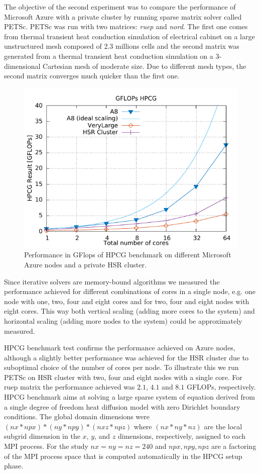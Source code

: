 \documentclass[3p,times]{elsarticle}
\begin{document}
The objective of the second experiment was to compare the performance of Microsoft Azure with a private cluster by running sparse matrix solver called PETSc. PETSc was run with two matrices: \textit{ruep} and \textit{nord}. The first one comes from thermal transient heat conduction simulation of electrical cabinet on a large unstructured mesh composed of 2.3 millions cells and the second matrix was generated from a thermal transient heat conduction simulation on a 3-dimensional Cartesian mesh of moderate size. Due to different mesh types, the second matrix converges much quicker than the first one. 

\begin{figure}
	\centering
	\includegraphics[width=.5\linewidth]{gplt-gflops-hpcg}
	
	\caption{Performance in GFlops of HPCG benchmark on different Microsoft Azure nodes and a private HSR cluster. }
	\label{fig:hpcg}
\end{figure}

Since iterative solvers are memory-bound algorithms we measured the performance achieved for different combinations of cores in a single node, e.g. one node with one, two, four and eight cores and for two, four and eight nodes with eight cores. This way both vertical scaling (adding more cores to the system) and horizontal scaling (adding more nodes to the system) could be approximately measured. %

HPCG benchmark test confirms the performance achieved on Azure nodes, although a slightly better performance was achieved for the HSR cluster due to suboptimal choice of the number of cores per node.  To illustrate this we run PETSc on HSR cluster with two, four and eight nodes with a single core. For ruep matrix the performance achieved was $2.1$, $4.1$ and $8.1$ GFLOPs, respectively. HPCG benchmark aims at solving a large sparse system of equation derived from a single degree of freedom heat diffusion model with zero Dirichlet boundary conditions. The global domain dimensions were $(nx * npx ) * (ny * npy ) * (nxz * npz )$ where $(nx * ny * nz )$ are the local subgrid dimension in the $x$, $y$, and $z$ dimensions, respectively, assigned to each MPI process. For the study $nx = ny = nz = 240$ and $npx, npy, npz$ are a factoring of the MPI process space that is computed automatically in the HPCG setup phase.
\end{document}
